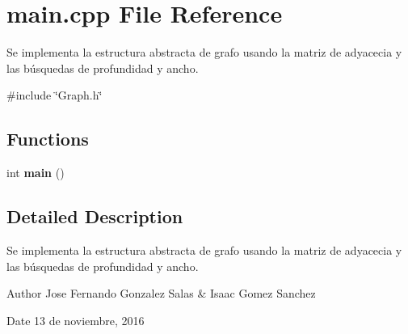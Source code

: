 \section{main.\+cpp File Reference}
\label{main_8cpp}


Se implementa la estructura abstracta de grafo usando la matriz de adyacecia y las búsquedas de profundidad y ancho.  


{\ttfamily \#include \char`\"{}Graph.\+h\char`\"{}}\newline
\subsection*{Functions}
\begin{DoxyCompactItemize}
\item 
\label{main_8cpp_ae66f6b31b5ad750f1fe042a706a4e3d4} 
int {\bfseries main} ()
\end{DoxyCompactItemize}


\subsection{Detailed Description}
Se implementa la estructura abstracta de grafo usando la matriz de adyacecia y las búsquedas de profundidad y ancho. 

\begin{DoxyAuthor}{Author}
Jose Fernando Gonzalez Salas \& Isaac Gomez Sanchez 
\end{DoxyAuthor}
\begin{DoxyDate}{Date}
13 de noviembre, 2016 
\end{DoxyDate}
